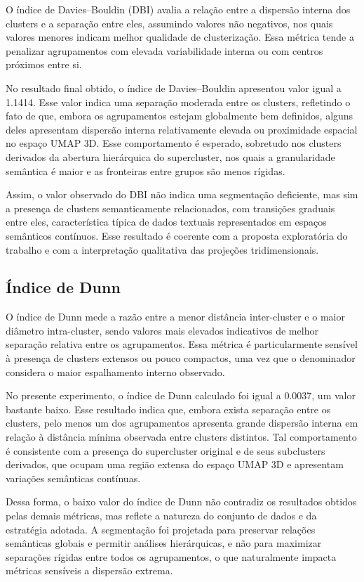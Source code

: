 \documentclass[12pt,a4paper]{article}
\begin{document}
O índice de Davies–Bouldin (DBI) avalia a relação entre a dispersão interna dos clusters e a separação entre eles, assumindo valores não negativos, nos quais valores menores indicam melhor qualidade de clusterização. Essa métrica tende a penalizar agrupamentos com elevada variabilidade interna ou com centros próximos entre si.

No resultado final obtido, o índice de Davies–Bouldin apresentou valor igual a 1.1414. Esse valor indica uma separação moderada entre os clusters, refletindo o fato de que, embora os agrupamentos estejam globalmente bem definidos, alguns deles apresentam dispersão interna relativamente elevada ou proximidade espacial no espaço UMAP 3D. Esse comportamento é esperado, sobretudo nos clusters derivados da abertura hierárquica do supercluster, nos quais a granularidade semântica é maior e as fronteiras entre grupos são menos rígidas.

Assim, o valor observado do DBI não indica uma segmentação deficiente, mas sim a presença de clusters semanticamente relacionados, com transições graduais entre eles, característica típica de dados textuais representados em espaços semânticos contínuos. Esse resultado é coerente com a proposta exploratória do trabalho e com a interpretação qualitativa das projeções tridimensionais.

\subsection{Índice de Dunn}

O índice de Dunn mede a razão entre a menor distância inter-cluster e o maior diâmetro intra-cluster, sendo valores mais elevados indicativos de melhor separação relativa entre os agrupamentos. Essa métrica é particularmente sensível à presença de clusters extensos ou pouco compactos, uma vez que o denominador considera o maior espalhamento interno observado.

No presente experimento, o índice de Dunn calculado foi igual a 0.0037, um valor bastante baixo. Esse resultado indica que, embora exista separação entre os clusters, pelo menos um dos agrupamentos apresenta grande dispersão interna em relação à distância mínima observada entre clusters distintos. Tal comportamento é consistente com a presença do supercluster original e de seus subclusters derivados, que ocupam uma região extensa do espaço UMAP 3D e apresentam variações semânticas contínuas.

Dessa forma, o baixo valor do índice de Dunn não contradiz os resultados obtidos pelas demais métricas, mas reflete a natureza do conjunto de dados e da estratégia adotada. A segmentação foi projetada para preservar relações semânticas globais e permitir análises hierárquicas, e não para maximizar separações rígidas entre todos os agrupamentos, o que naturalmente impacta métricas sensíveis a dispersão extrema.
\end{document}
